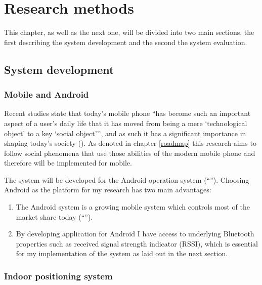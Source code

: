 \section{Research methods}

This chapter, as well as the next one, will be divided into two main sections, the first describing the system development and the second the system evaluation.

\subsection{System development}

\subsubsection{Mobile and Android}


Recent studies state that today's mobile phone ``has become such an important aspect of a user's daily life that it has moved from being a mere `technological object' to a key `social object{'}'', and as such it has a significant importance in shaping today's society (\cite{srivastava05}).
As denoted in chapter \ref{roadmap} this research aims to follow social phenomena that use those abilities of the modern mobile phone and therefore will be implemented for mobile.

The system will be developed for the Android operation system (``'').
Choosing Android as the platform for my research has two main advantages:
\begin{enumerate}
	\item The Android system is a growing mobile system which controls most of the market share today (``'').
	\item By developing application for Android I have access to underlying Bluetooth properties such as received signal strength indicator (RSSI), which is essential for my implementation of the system as laid out in the next section.
\end{enumerate}

\subsubsection{Indoor positioning system}\label{methods:ips}

